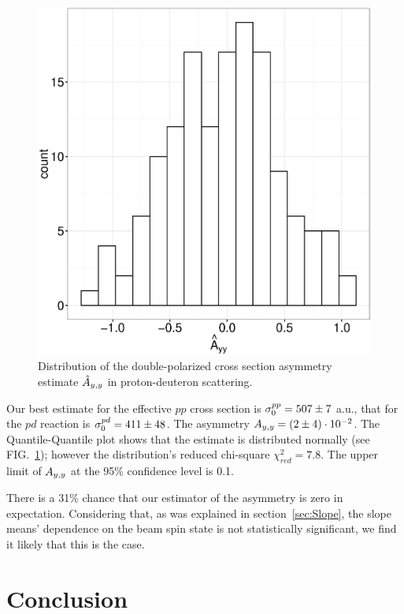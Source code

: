 \documentclass[reprint, superscriptaddress]{revtex4-1}
\newcommand{\scl}{.45}
\newcommand{\vp}[2]{#1\cdot10^{#2}}
\begin{document}
\begin{figure}[h]
	\centering
	\includegraphics[scale=\scl]{img/Ayy_dens.eps}
	\caption{Distribution of the double-polarized cross section asymmetry estimate $\Ayy*$ in proton-deuteron scattering.\label{fig:AyyDensity}}
\end{figure}

Our best estimate for the effective $pp$ cross section is $\CS[0]^{pp} = 507 \pm 7$ a.u., that for the $pd$ reaction is $\CS[0]^{pd} = 411 \pm 48$. The asymmetry $\Ayy = \vp{(2 \pm 4)}{-2}$. The Quantile-Quantile plot shows that the estimate is distributed normally (see FIG.~\ref{fig:AyyDensity}); however the distribution's reduced chi-square $\chi^2_{red} = 7.8$. The upper limit of $\Ayy$ at the 95\% confidence level is 0.1.

There is a 31\% chance that our estimator of the asymmetry is zero in expectation. Considering that, as was explained in section~\ref{sec:Slope}, the slope means' dependence on the beam spin state is not statistically significant, we find it likely that this is the case. 

\section{Conclusion}
\end{document}
